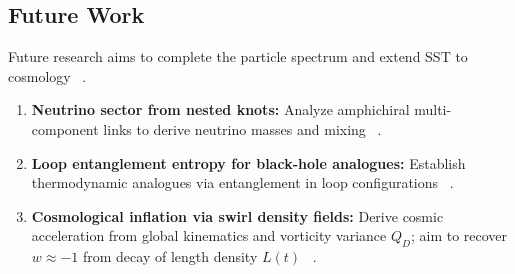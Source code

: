 \documentclass[10pt,reprint,aps,onecolumn,nofootinbib]{revtex4-2}
\begin{document}
    \subsection*{Future Work}
        Future research aims to complete the particle spectrum and extend SST to cosmology~ \cite{sstCanon}.
        \begin{enumerate}
            \item \textbf{Neutrino sector from nested knots:} Analyze amphichiral multi-component links to derive neutrino masses and mixing~ \cite{sstLagrangian}.
            \item \textbf{Loop entanglement entropy for black-hole analogues:} Establish thermodynamic analogues via entanglement in loop configurations~ \cite{sstCanon}.
            \item \textbf{Cosmological inflation via swirl density fields:} Derive cosmic acceleration from global kinematics and vorticity variance $Q_D$; aim to recover $w \approx -1$ from decay of length density $L(t)$~ \cite{sstCanon}.
        \end{enumerate}
\end{document}
